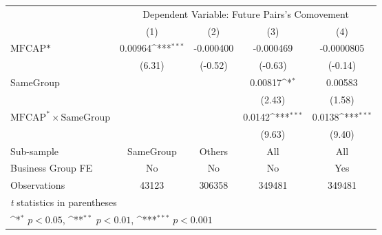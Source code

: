 {
\def\sym#1{\ifmmode^{#1}\else\(^{#1}\)\fi}
\begin{tabular}{l*{4}{c}}
\hline\hline
                &\multicolumn{4}{c}{Dependent Variable:  Future Pairs's Comovement}         \\\cmidrule(lr){2-5}
                &\multicolumn{1}{c}{(1)}         &\multicolumn{1}{c}{(2)}         &\multicolumn{1}{c}{(3)}         &\multicolumn{1}{c}{(4)}         \\
\hline
$ \text{MFCAP*} $&  0.00964\sym{***}&-0.000400         &-0.000469         &-0.0000805         \\
                &   (6.31)         &  (-0.52)         &  (-0.63)         &  (-0.14)         \\
[1em]
SameGroup       &                  &                  &  0.00817\sym{*}  &  0.00583         \\
                &                  &                  &   (2.43)         &   (1.58)         \\
[1em]
 $ \text{MFCAP}^* \times {\text{SameGroup} }  $ &                  &                  &   0.0142\sym{***}&   0.0138\sym{***}\\
                &                  &                  &   (9.63)         &   (9.40)         \\
\hline
Sub-sample      &SameGroup         &   Others         &      All         &      All         \\
Business Group FE&       No         &       No         &       No         &      Yes         \\
Observations    &    43123         &   306358         &   349481         &   349481         \\
\hline\hline
\multicolumn{5}{l}{\footnotesize \textit{t} statistics in parentheses}\\
\multicolumn{5}{l}{\footnotesize \sym{*} \(p<0.05\), \sym{**} \(p<0.01\), \sym{***} \(p<0.001\)}\\
\end{tabular}
}
